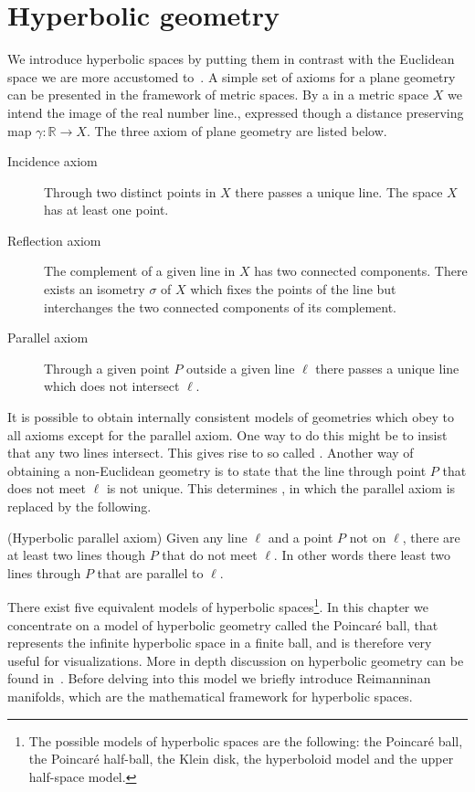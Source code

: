 \chapter{Hyperbolic geometry}\label{hyperbolic}
We introduce hyperbolic spaces by putting them in contrast with the Euclidean space we are more accustomed to~\cite{Iversen1992hyperbolicGeometry}.
A simple set of axioms for a plane geometry can be presented in the framework of metric spaces. By a  in a metric space $X$ we intend the image of the real number line., expressed though a distance preserving map $\gamma: \mathbb{R}\to X$.
The three axiom of plane geometry are listed below.
\begin{description}
    \item[Incidence axiom]  Through two distinct points in $X$ there passes a unique line. The space $X$ has at least one point.
    \item[Reflection axiom] The complement of a given line in $X$ has two connected components. There exists an isometry $\sigma$ of $X$ which fixes the points of the line but interchanges the two connected components of its complement.
    \item[Parallel axiom] Through a given point $P$ outside a given line $\ell$ there passes a unique line which does not intersect $\ell$. 
\end{description}

It is possible to obtain internally consistent models of geometries which obey to all axioms except for the parallel axiom. One way to do this might be to insist that any two lines intersect. This gives rise to so called . Another way of obtaining a non-Euclidean geometry is to state that the line through point $P$ that does not meet $\ell$ is not unique. This determines , in which the parallel axiom is replaced by the following.

\begin{definition}(Hyperbolic parallel axiom)
    Given any line $\ell$ and a point $P$ not on $\ell$, there are at least two lines though $P$ that do not meet $\ell$. In other words there least two lines through $P$ that are parallel to $\ell$.
\end{definition}

There exist five equivalent models of hyperbolic spaces\footnote{The possible models of hyperbolic spaces are the following: the Poincaré ball, the Poincaré half-ball, the Klein disk, the hyperboloid model and the upper half-space model.}. In this chapter we concentrate on a model of hyperbolic geometry called the Poincaré ball, that represents the infinite hyperbolic space in a finite ball, and is therefore very useful for visualizations. More in depth discussion on hyperbolic geometry can be found in~\cite{Anderson2006hyperbolicGeometry}\cite{Ramsay2013introductionHyperbolicGeometry}. Before delving into this model we briefly introduce Reimanninan manifolds, which are the mathematical framework for hyperbolic spaces.

